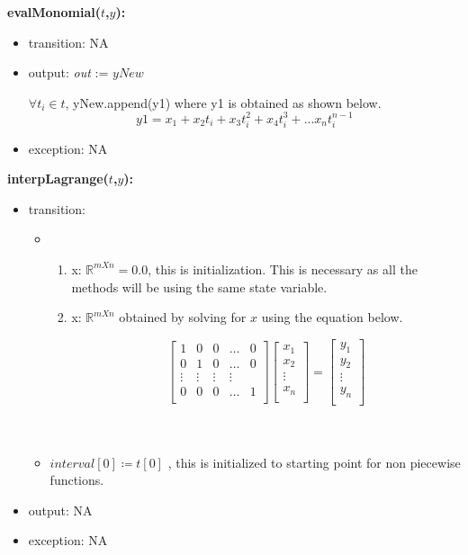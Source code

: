 \documentclass[12pt, titlepage]{article}
\begin{document}
\noindent \textbf{evalMonomial($t$,$y$):}
\begin{itemize}
	\item transition: NA
	
	\item output:  \textit{out} := $yNew$
	
	$\forall t_i \in t$, yNew.append(y1) where y1 is obtained as shown below.
	\begin{equation*}
	y1 = x_1 + x_2 t_i + x_3 t_i ^2 + x_4 t_i ^3 + ... x_n t_i ^{n-1}  
	\end{equation*}
	
	\item exception: NA
\end{itemize}


\noindent \textbf{interpLagrange($t$,$y$):}
\begin{itemize}
	\item transition:
	\begin{itemize}
		\item 
		\begin{enumerate}
			\item x: $\mathbb{R}^{m X n} = 0.0 $, this is initialization. 
			This is necessary as all the methods will be using the same state 
			variable.
			
			\item x: $\mathbb{R}^{m X n}$ obtained by solving for $x$ using 
			the equation below.
			
			\begin{equation*}
			\begin{bmatrix}
			1 & 0 & 0 & \dots & 0 \\
			0 & 1 & 0 & \dots & 0 \\
			\vdots & \vdots & \vdots & \vdots \\
			0 & 0 & 0 & \dots & 1 \\
			\end{bmatrix}
			\begin{bmatrix}
			x_1  \\
			x_2 \\
			\vdots \\
			x_n \\
			\end{bmatrix} = 
			\begin{bmatrix}
			y_1  \\
			y_2 \\
			\vdots \\
			y_n \\
			\end{bmatrix}
			\end{equation*}\\ \\ 
		\end{enumerate}
		\item $interval[0] \coloneqq t[0] $ , this is initialized to 
		starting point for non piecewise functions.
	\end{itemize}	
	\item output: NA 
	
	\item exception: NA
\end{itemize}
\end{document}
